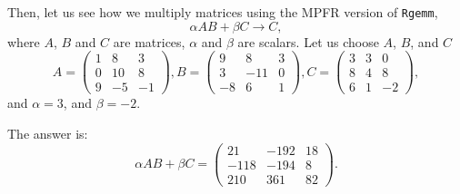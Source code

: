 \documentclass[12pt]{article}
\begin{document}
Then, let us see how we multiply matrices using the MPFR version of {\tt Rgemm},
\[
 \alpha A B + \beta C \rightarrow C,
\]
where $A$, $B$ and $C$ are matrices, $\alpha$ and $\beta$ are scalars.
Let us choose $A$, $B$, and $C$
\begin{equation}
A = \left (
\begin{array}{rrr}
1 & 8 & 3 \\
0 & 10 & 8 \\
9 & -5 & -1
\end{array}
\right ),
B = \left (
\begin{array}{rrr}
9 & 8 & 3 \\
3 & -11 & 0 \\
-8 & 6 & 1
\end{array}
\right ),
C = \left (
\begin{array}{rrr}
3 & 3 & 0 \\
8 & 4 & 8 \\
6 & 1 & -2
\end{array}
\right ), \nonumber
\end{equation}
and $\alpha = 3$, and $\beta=-2$.

The answer is:
\begin{equation}
\alpha AB + \beta C = \left (
\begin{array}{rrr}
21 & -192 & 18 \\
-118 & -194 & 8 \\
210 & 361 & 82
\end{array}
\right ). \nonumber
\end{equation}
\end{document}
